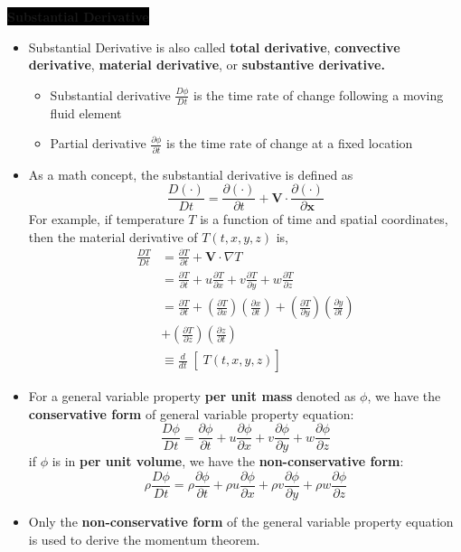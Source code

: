 \colorbox{black}{\textbf{\color{white}Substantial Derivative}}
\begin{itemize}
    \item Substantial Derivative is also called \textbf{\color{orange}total derivative}, \textbf{\color{red}convective derivative}, \textbf{\color{blue}material derivative}, or \textbf{\color{teal}substantive derivative.}
    \begin{itemize}
        \item Substantial derivative $\frac{D\phi}{Dt}$ is the time rate of change following a moving fluid element
        \item Partial derivative $\frac{\partial \phi}{\partial t}$ is the time rate of change  at a fixed location
    \end{itemize}
    \item As a math concept, the substantial derivative is defined as
    \begin{equation*}
        \frac{D(\cdot)}{Dt} = \frac{\partial (\cdot)}{\partial t} + \bm{V}\cdot \frac{\partial (\cdot )}{\partial \bm{x}}
    \end{equation*}
    For example, if temperature $T$ is a function of time and spatial coordinates, then the material derivative of $T(t,x,y,z)$ is,
    \begin{align*}
        \frac{DT}{Dt} &= \frac{\partial T}{\partial t} + \bm{V} \cdot \nabla T \\
        &= \frac{\partial T}{\partial t} + u \frac{\partial T}{\partial x} + v \frac{\partial T}{\partial y} + w \frac{\partial T}{\partial z} \\
        &= \frac{\partial T}{\partial t} + \left(\frac{\partial T}{\partial x}\right)\left(\frac{\partial x}{\partial t}\right) + \left(\frac{\partial T}{\partial y}\right)\left(\frac{\partial y}{\partial t}\right)\\
        &+\left(\frac{\partial T}{\partial z}\right)\left(\frac{\partial z}{\partial t}\right) \\
        &\equiv \left.\left.\frac{d}{dt}\right[T(t,x,y,z)\right]
    \end{align*}
    \item For a general variable property \textbf{per unit mass} denoted as $\phi$, we have the \textbf{\color{orange}conservative form} of general variable property equation:
    \begin{equation*}
        \frac{D\phi }{D t} = \frac{\partial \phi}{\partial t} + u \frac{\partial \phi}{\partial x} + v \frac{\partial \phi}{\partial y} + w \frac{\partial \phi}{\partial z}
    \end{equation*}
    if $\phi$ is in \textbf{per unit volume}, we have the \textbf{\color{orange}non-conservative form}:
    \begin{equation*}
        \rho\frac{D\phi }{D t} = \rho \frac{\partial \phi}{\partial t} + \rho u \frac{\partial \phi}{\partial x} + \rho v \frac{\partial \phi}{\partial y} + \rho w \frac{\partial \phi}{\partial z}
    \end{equation*}
    \item Only the \textbf{\color{orange}non-conservative form} of the general variable property equation is used to derive the momentum theorem.
\end{itemize}

